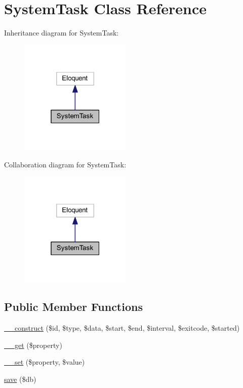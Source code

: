 \hypertarget{class_system_task}{}\section{System\+Task Class Reference}
\label{class_system_task}


Inheritance diagram for System\+Task\+:
\nopagebreak
\begin{figure}[H]
\begin{center}
\leavevmode
\includegraphics[width=151pt]{class_system_task__inherit__graph}
\end{center}
\end{figure}


Collaboration diagram for System\+Task\+:
\nopagebreak
\begin{figure}[H]
\begin{center}
\leavevmode
\includegraphics[width=151pt]{class_system_task__coll__graph}
\end{center}
\end{figure}
\subsection*{Public Member Functions}
\begin{DoxyCompactItemize}
\item 
\hyperlink{class_system_task_a93d29ad7bccf75a4bbe421d9dfa1a9a2}{\+\_\+\+\_\+construct} (\$id, \$type, \$data, \$start, \$end, \$interval, \$exitcode, \$started)
\item 
\hyperlink{class_system_task_a6481e8cfc93c80885b3d72a6e1f15a1f}{\+\_\+\+\_\+get} (\$property)
\item 
\hyperlink{class_system_task_a9b7f2b58fa3c9e81f142efb424433163}{\+\_\+\+\_\+set} (\$property, \$value)
\item 
\hyperlink{class_system_task_a42cdab25d443d3ee588637026856d0ac}{save} (\$db)
\end{DoxyCompactItemize}
